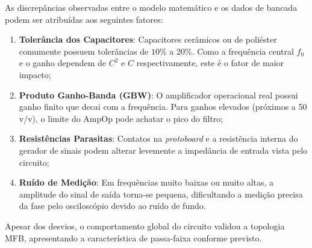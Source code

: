 As discrepâncias observadas entre o modelo matemático e os dados de bancada podem ser atribuídas aos seguintes fatores:

\begin{enumerate}
	\item \textbf{Tolerância dos Capacitores}: Capacitores cerâmicos ou de poliéster comumente possuem tolerâncias de $10\%$ a $20\%$. Como a frequência central $f_0$ e o ganho dependem de $C^2$ e $C$ respectivamente, este é o fator de maior impacto;
	
	\item \textbf{Produto Ganho-Banda (GBW)}: O amplificador operacional real possui ganho finito que decai com a frequência. Para ganhos elevados (próximos a 50 v/v), o limite do AmpOp pode achatar o pico do filtro;
	
	\item \textbf{Resistências Parasitas}: Contatos na \textit{protoboard} e a resistência interna do gerador de sinais podem alterar levemente a impedância de entrada vista pelo circuito;
	
	\item \textbf{Ruído de Medição}: Em frequências muito baixas ou muito altas, a amplitude do sinal de saída torna-se pequena, dificultando a medição precisa da fase pelo osciloscópio devido ao ruído de fundo.
\end{enumerate}

Apesar dos desvios, o comportamento global do circuito validou a topologia MFB, apresentando a característica de passa-faixa conforme previsto.